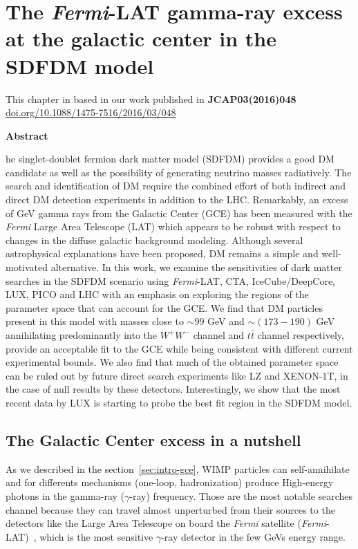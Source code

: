 \chapter{The \textit{Fermi}-LAT gamma-ray excess at the galactic center in the SDFDM model}

\begin{flushright}
This chapter in based in our work published in \textbf{JCAP03(2016)048}\\ 
\url{doi.org/10.1088/1475-7516/2016/03/048}
\end{flushright}
\begin{center}
\textbf{Abstract}
\end{center}
he singlet-doublet fermion dark matter model (SDFDM) provides a good DM candidate as well as the possibility of generating neutrino masses radiatively.
 The search and identification of DM require the combined effort of both indirect and direct DM detection experiments in addition to the LHC.
 Remarkably, an excess of GeV gamma rays from the Galactic Center (GCE) has been measured with the \textit{Fermi}  Large Area Telescope (LAT) which appears to be robust with respect to changes in the diffuse galactic background modeling.
 Although several astrophysical explanations have been proposed, DM remains a simple and well-motivated alternative.
 In this work, we examine the sensitivities of dark matter searches in the SDFDM scenario using \textit{Fermi}-LAT, CTA, IceCube/DeepCore, LUX, PICO and LHC with an emphasis on exploring the regions of the parameter space that can account for the GCE.
 We find that DM particles present in this model with masses close to $\sim 99$ GeV and $\sim (173-190)$ GeV annihilating predominantly into the $W^+W^-$ channel and $t\bar{t}$ channel respectively, provide an acceptable fit to the GCE while being consistent with different current experimental bounds. We also find that much of the obtained parameter space can be ruled out by future direct search experiments like LZ and XENON-1T, in the case of null results by these detectors. Interestingly, we show that the most recent data by LUX is starting to probe the best fit region in the SDFDM model.











\section{The Galactic Center excess in a nutshell }
%
As we described in the section~\ref{sec:intro-gce}, WIMP particles can self-annihilate and for differents mechanisms (one-loop, hadronization) produce High-energy photons in the gamma-ray ($\gamma$-ray) frequency.
Those are the most notable searches channel because they can travel almost unperturbed from their sources to the detectors like the Large Area Telescope on board the \textit{Fermi} satellite (\textit{Fermi}-LAT)~\cite{Fermi}, which is the most sensitive $\gamma$-ray detector in the few GeVs energy range.

